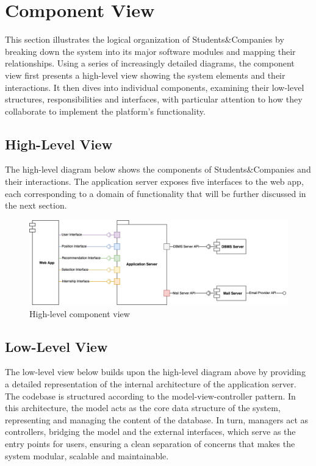 \section{Component View}
This section illustrates the logical organization of Students\&Companies by breaking down the system into its major software modules and mapping their relationships.
Using a series of increasingly detailed diagrams, the component view first presents a high-level view showing the system elements and their interactions.
It then dives into individual components, examining their low-level structures, responsibilities and interfaces, with particular attention to how they collaborate to implement the platform's functionality.

\subsection{High-Level View}
The high-level diagram below shows the components of Students\&Companies and their interactions.
The application server exposes five interfaces to the web app, each corresponding to a domain of functionality that will be further discussed in the next section.

\begin{figure}[h]
    \centering
    \includegraphics[width=16cm]{images/component-view/high-level.png}
    \caption{High-level component view}
\end{figure}

\subsection{Low-Level View}
The low-level view below builds upon the high-level diagram above by providing a detailed representation of the internal architecture of the application server.
The codebase is structured according to the model-view-controller pattern.
In this architecture, the model acts as the core data structure of the system, representing and managing the content of the database.
In turn, managers act as controllers, bridging the model and the external interfaces, which serve as the entry points for users, ensuring a clean separation of concerns that makes the system modular, scalable and maintainable.


